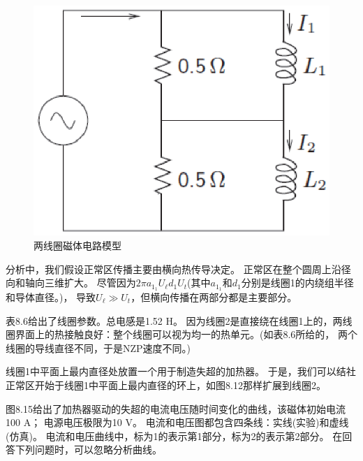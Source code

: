 \begin{figure}
	\centering
	\includegraphics[scale=0.6]{chpt8/figs/fig8.14.eps}
	\caption{两线圈磁体电路模型}
\end{figure}

分析中，我们假设正常区传播主要由横向热传导决定。
正常区在整个圆周上沿径向和轴向三维扩大。
尽管因为$2\pi a_{1_1} U_\ell d_1 U_t$(其中$a_{1_1}$和$d_1$分别是线圈1的内绕组半径和导体直径。)，
导致$U_\ell\gg U_t$，但横向传播在两部分都是主要部分。

表8.6给出了线圈参数。总电感是1.52 H。
因为线圈2是直接绕在线圈1上的，两线圈界面上的热接触良好：整个线圈可以视为均一的热单元。(如表8.6所给的，
两个线圈的导线直径不同，于是NZP速度不同。)

线圈1中平面上最内直径处放置一个用于制造失超的加热器。
于是，我们可以结社正常区开始于线圈1中平面上最内直径的环上，如图8.12那样扩展到线圈2。

图8.15给出了加热器驱动的失超的电流电压随时间变化的曲线，该磁体初始电流100 A；
电源电压极限为10 V。
电流和电压图都包含四条线：实线(实验)和虚线(仿真)。
电流和电压曲线中，标为1的表示第1部分，标为2的表示第2部分。
在回答下列问题时，可以忽略分析曲线。

